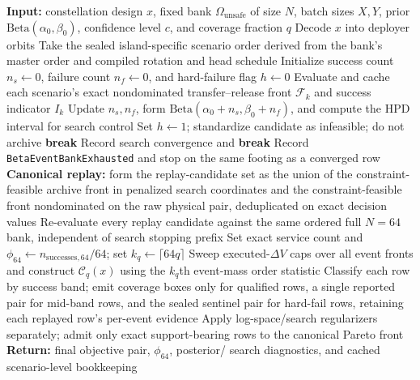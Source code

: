     \begin{algorithm}[htb]
    \caption[Mission-scoring workflow]{Mission-scoring workflow for one candidate constellation under the production profile.}
    \label{alg:beta_dist_scoring}
    \begin{algorithmic}[1]
    \State \textbf{Input:} constellation design \(x\), fixed bank \(\Omega_{\mathrm{unsafe}}\) of size \(N\), batch sizes \(X,Y\), prior \(\mathrm{Beta}(\alpha_0,\beta_0)\), confidence level \(c\), and coverage fraction \(q\)
    \State Decode \(x\) into deployer orbits
    \State Take the sealed island-specific scenario order derived from the bank's master order and compiled rotation and head schedule
    \State Initialize success count \(n_s \gets 0\), failure count \(n_f \gets 0\), and hard-failure flag \(h \gets 0\)
        \State Evaluate and cache each scenario's exact nondominated transfer--release front \(\mathcal{F}_k\) and success indicator \(I_k\)
        \State Update \(n_s,n_f\), form \(\mathrm{Beta}(\alpha_0+n_s,\beta_0+n_f)\), and compute the HPD interval for search control
            \State Set \(h\gets1\); standardize candidate as infeasible; do not archive
            \State \textbf{break}
        \EndIf
            \State Record search convergence and \textbf{break}
        \EndIf
            \State Record \verb|BetaEventBankExhausted| and stop on the same footing as a converged row
        \EndIf
    \EndFor
    \State \textbf{Canonical replay:} form the replay-candidate set as the union of the constraint-feasible archive front in penalized search coordinates and the constraint-feasible front nondominated on the raw physical pair, deduplicated on exact decision values
    \State Re-evaluate every replay candidate against the same ordered full \(N=64\) bank, independent of search stopping prefix
    \State Set exact service count and \(\phi_{64}\gets n_{\mathrm{successes},64}/64\); set \(k_q\gets\lceil64q\rceil\)
    \State Sweep executed-\(\Delta V\) caps over all event fronts and construct \(\mathcal{C}_q(x)\) using the \(k_q\)th event-mass order statistic
    \State Classify each row by success band; emit coverage boxes only for qualified rows, a single reported pair for mid-band rows, and the sealed sentinel pair for hard-fail rows, retaining each replayed row's per-event evidence
    \State Apply log-space/search regularizers separately; admit only exact support-bearing rows to the canonical Pareto front
    \State \textbf{Return:} final objective pair, \(\phi_{64}\), posterior/ search diagnostics, and cached scenario-level bookkeeping
    \end{algorithmic}
    \end{algorithm}

